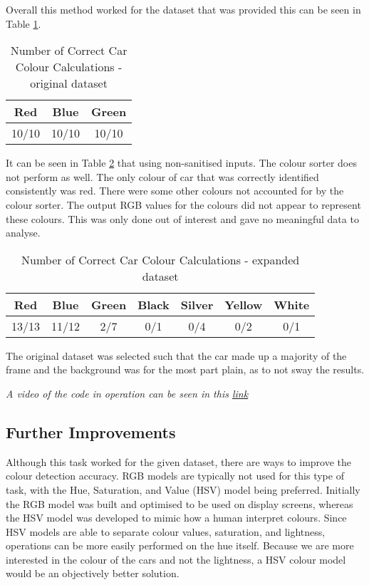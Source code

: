 \documentclass[conference]{IEEEtran}
\begin{document}
Overall this method worked for the dataset that was provided this can be seen in Table \ref{table:car_colours_original_dataset}.

\begin{table}
\begin{center}
\caption{Number of Correct Car Colour Calculations - original dataset}
\begin{tabular}{ || c || c || c || }
\hline
 Red & Blue & Green\\ 
\hline
 10/10 & 10/10 & 10/10 \\  
\hline

\end{tabular}
\label{table:car_colours_original_dataset}
\end{center}
\end{table}

It can be seen in Table \ref{table:car_colours_expanded_dataset} that using non-sanitised inputs. The colour sorter does not perform as well. The only colour of car that was correctly identified consistently was red.  There were some other colours not accounted for by the colour sorter. The output RGB values for the colours did not appear to represent these colours. This was only done out of interest and gave no meaningful data to analyse. 

\begin{table}
\begin{center}
\caption{Number of Correct Car Colour Calculations - expanded dataset}
\begin{tabular}{ || c || c || c || c || c || c || c || }
\hline
 Red & Blue & Green & Black & Silver & Yellow & White\\ 
\hline
 13/13 & 11/12 & 2/7 & 0/1 & 0/4 & 0/2 & 0/1 \\  
\hline

\end{tabular}
\label{table:car_colours_expanded_dataset}
\end{center}
\end{table}


The original dataset was selected such that the car made up a majority of the frame and the background was for the most part plain, as to not sway the results.

\textit{A video of the code in operation can be seen in this \href{https://youtu.be/hWfO3ubkQVc}{link}}


\subsection{Further Improvements}
Although this task worked for the given dataset, there are ways to improve the colour detection accuracy. RGB models are typically not used for this type of task, with the Hue, Saturation, and Value (HSV) model being preferred. Initially the RGB model was built and optimised to be used on display screens, whereas the HSV model was developed to mimic how a human interpret colours. Since HSV models are able to separate colour values, saturation, and lightness, operations can be more easily performed on the hue itself. Because we are more interested in the colour of the cars and not the lightness, a HSV colour model would be an objectively better solution. \cite{ref:HSV_vs_RGB}
\end{document}
